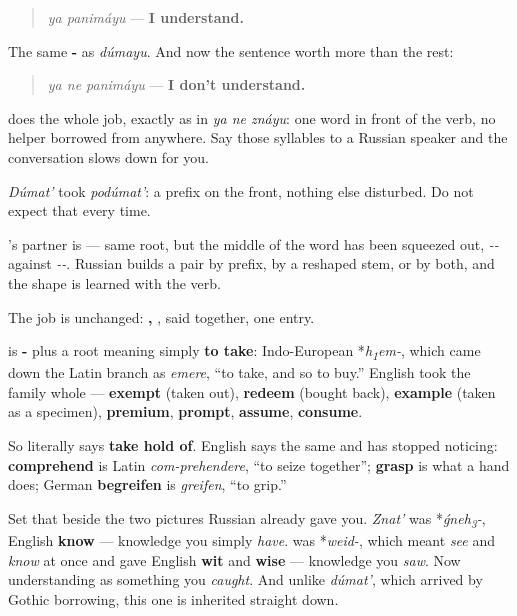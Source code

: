 \begin{quote}
\emph{ya panimáyu} — \textbf{I understand.}
\end{quote}

The same \textbf{-} as \emph{dúmayu}. And now the sentence worth more than the rest:

\begin{quote}
\emph{ya ne panimáyu} — \textbf{I don't understand.}
\end{quote}

\textbf{} does the whole job, exactly as in \emph{ya ne znáyu}: one word in front of the verb, no helper borrowed from anywhere. Say those syllables to a Russian speaker and the conversation slows down for you.

\begin{grammarlens}[title={Grammar Lens: the partner, and a warning about its shape}]
\emph{Dúmat'} took \emph{podúmat'}: a prefix on the front, nothing else disturbed. Do not expect that every time.

\textbf{}'s partner is \textbf{} — same root, but the middle of the word has been squeezed out, \emph{--} against \emph{--}. Russian builds a pair by prefix, by a reshaped stem, or by both, and the shape is learned with the verb.

The job is unchanged: \textbf{, }, said together, one entry.
\end{grammarlens}

\begin{cousinweb}
\textbf{} is \textbf{-} plus a root meaning simply \textbf{to take}: Indo-European *\emph{h\textsubscript{1}em-}, which came down the Latin branch as \emph{emere}, \textquotedblleft{}to take, and so to buy.\textquotedblright{} English took the family whole — \textbf{exempt} (taken out), \textbf{redeem} (bought back), \textbf{example} (taken as a specimen), \textbf{premium}, \textbf{prompt}, \textbf{assume}, \textbf{consume}.

So \emph{} literally says \textbf{take hold of}. English says the same and has stopped noticing: \textbf{comprehend} is Latin \emph{com-prehendere}, \textquotedblleft{}to seize together\textquotedblright{}; \textbf{grasp} is what a hand does; German \textbf{begreifen} is \emph{greifen}, \textquotedblleft{}to grip.\textquotedblright{}

Set that beside the two pictures Russian already gave you. \emph{Znat'} was *\emph{ǵneh\textsubscript{3}-}, English \textbf{know} — knowledge you simply \emph{have}. \textbf{} was *\emph{weid-}, which meant \emph{see} and \emph{know} at once and gave English \textbf{wit} and \textbf{wise} — knowledge you \emph{saw}. Now understanding as something you \emph{caught}. And unlike \emph{dúmat'}, which arrived by Gothic borrowing, this one is inherited straight down.
\end{cousinweb}

